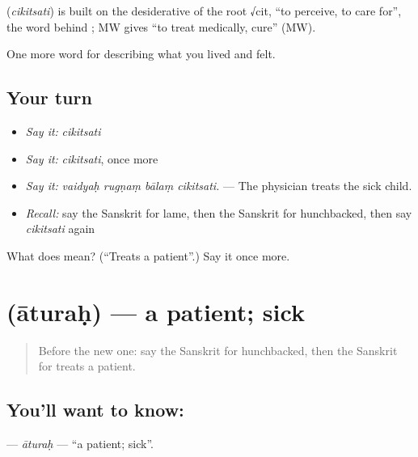 \begin{cousinweb}
\textbf{} (\emph{cikitsati}) is built on the desiderative of the root √cit, \textquotedblleft{}to perceive, to care for\textquotedblright{}, the word behind \textbf{}; MW gives \textquotedblleft{}to treat medically, cure\textquotedblright{} (MW).
\end{cousinweb}

\begin{grammarlens}[title={What you've built}]
One more word for describing what you lived and felt.
\end{grammarlens}

\subsection*{Your turn}
\begin{itemize}
\raggedright
  \item \emph{Say it:} \emph{cikitsati}
  \item \emph{Say it:} \emph{cikitsati}, once more
  \item \emph{Say it:} \emph{vaidyaḥ rugṇaṃ bālaṃ cikitsati.} — The physician treats the sick child.
  \item \emph{Recall:} say the Sanskrit for lame, then the Sanskrit for hunchbacked, then say \emph{cikitsati} again
\end{itemize}

\begin{tcolorbox}[breakable,colback=teal!4,colframe=teal!35!black,title={Before you move on}]
What does  mean? (\textquotedblleft{}Treats a patient\textquotedblright{}.) Say it once more.
\end{tcolorbox}
\section[\texorpdfstring{\sk{आतुरः} (āturaḥ)}{आतुरः (āturaḥ)}]{ (āturaḥ) — a patient; sick}

\label{lesson:SA-C482-aturah}



\begin{quote}
Before the new one: say the Sanskrit for hunchbacked, then the Sanskrit for treats a patient.
\end{quote}

\subsection*{You'll want to know: }
\textbf{} — \emph{āturaḥ} — \textquotedblleft{}a patient; sick\textquotedblright{}.

